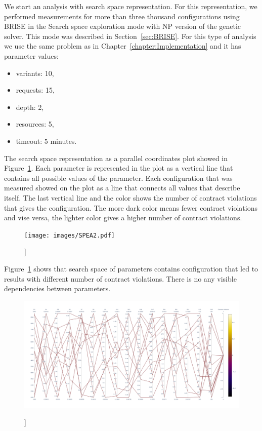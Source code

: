 We start an analysis with search space representation. For this representation, we performed measurements for more than three thousand configurations using BRISE in the Search space exploration mode with NP version of the genetic solver. This mode was described in Section~\ref{sec:BRISE}. For this type of analysis we use the same problem as in Chapter~\ref{chapter:Implementation} and it has parameter values:
\begin{itemize}
	\item variants: 10,
	\item requests: 15,
	\item depth: 2,
	\item resources: 5,
	\item timeout: 5 minutes.
\end{itemize}

The search space representation as a parallel coordinates plot showed in Figure~\ref{fig:SearchSpaceViewFull}.
Each parameter is represented in the plot as a vertical line that contains all possible values of the parameter. Each configuration that was measured showed on the plot as a line that connects all values that describe itself. The last vertical line and the color shows the number of contract violations that gives the configuration. The more dark color means fewer contract violations and vise versa, the lighter color gives a higher number of contract violations.

\begin{figure}
	\centering
	\texttt{[image: images/SPEA2.pdf]}
	\caption[]]{}
	\label{fig:SearchSpaceViewFull}
\end{figure}

Figure~\ref{fig:SearchSpaceViewFull} shows that search space of parameters contains configuration that led to results with different number of contract violations. There is no any visible dependencies between parameters. 

\begin{figure}
	\centering
	\includegraphics[width=\textwidth]{images/SPEA2_Zero_validity.html.pdf}
	\caption[]]{}
	\label{fig:SearchSpaceValid}
\end{figure}

